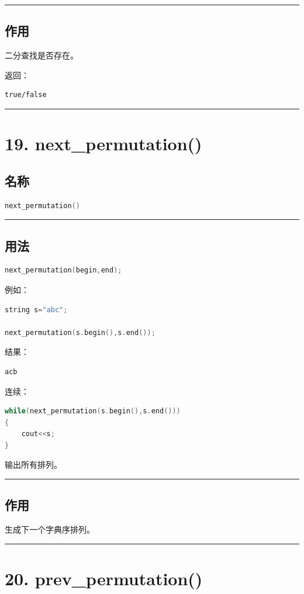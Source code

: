 \documentclass[10pt,twocolumn]{extarticle}
\begin{document}
\noindent\rule{\linewidth}{0.4pt}

\subsection{作用}
二分查找是否存在。

返回：
\begin{lstlisting}
true/false
\end{lstlisting}

\noindent\rule{\linewidth}{0.4pt}

\section{19. next\_permutation()}

\subsection{名称}
\begin{lstlisting}[language=C++]
next_permutation()
\end{lstlisting}

\noindent\rule{\linewidth}{0.4pt}

\subsection{用法}
\begin{lstlisting}[language=C++]
next_permutation(begin,end);
\end{lstlisting}
例如：
\begin{lstlisting}[language=C++]
string s="abc";

next_permutation(s.begin(),s.end());
\end{lstlisting}
结果：
\begin{lstlisting}
acb
\end{lstlisting}
连续：
\begin{lstlisting}[language=C++]
while(next_permutation(s.begin(),s.end()))
{
    cout<<s;
}
\end{lstlisting}
输出所有排列。

\noindent\rule{\linewidth}{0.4pt}

\subsection{作用}
生成下一个字典序排列。

\noindent\rule{\linewidth}{0.4pt}

\section{20. prev\_permutation()}
\end{document}
